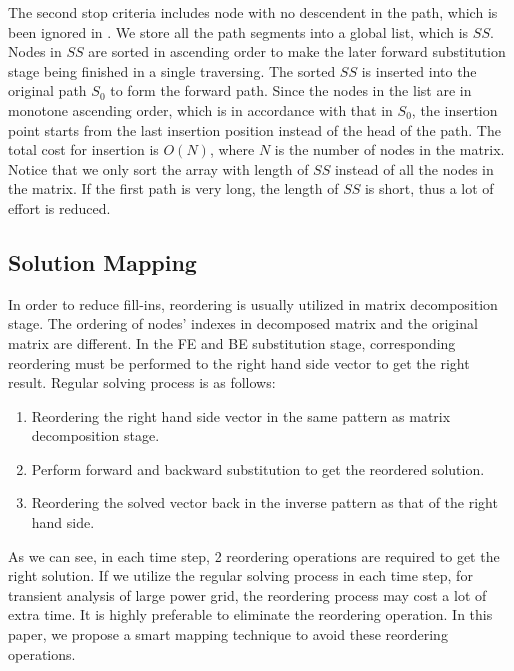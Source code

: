 The second stop criteria includes node with no descendent in the path, which is been ignored in \cite{Tinney}. We store all the path segments into a global list, which is $SS$. Nodes in $SS$ are sorted in ascending order to make the later forward substitution stage being finished in a single traversing. The sorted $SS$ is inserted into the original path $S_0$ to form the forward path. Since the nodes in the list are in monotone ascending order, which is in accordance with that in $S_0$, the insertion point starts from the last insertion position instead of the head of the path. The total cost for insertion is $O(N)$, where $N$ is the number of nodes in 
the matrix. Notice that we only sort the array with length of $SS$ instead of all the nodes in the matrix. If the first path is 
very long, the length of $SS$ is short, thus a lot of effort is reduced.

 \subsection{Solution Mapping}
In order to reduce fill-ins, reordering is usually utilized in matrix decomposition stage. The ordering of nodes' indexes in decomposed 
matrix and the original matrix are different. In the FE and BE substitution stage, corresponding reordering must 
be performed to the right hand side vector to get the right result. Regular solving process is as follows:
\begin{enumerate}[1)]
\item Reordering the right hand side vector in the same pattern as matrix decomposition stage.
\item Perform forward and backward substitution to get the reordered solution.
\item Reordering the solved vector back in the inverse pattern as that of the right hand side.
\end{enumerate}
As we can see, in each time step, 2 reordering operations are required to get the right solution. If we utilize the regular solving 
process in each time step, for transient analysis of large power grid, the reordering process may cost a lot of extra time. It is highly preferable to eliminate the reordering operation. In this paper, we propose a smart mapping technique to avoid these reordering operations.

